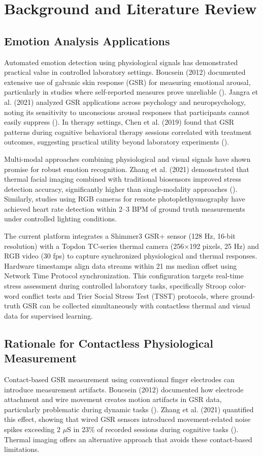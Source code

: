 \chapter{Background and Literature Review}


\section{Emotion Analysis Applications}
Automated emotion detection using physiological signals has demonstrated practical value in controlled laboratory settings. Boucsein (2012) documented extensive use of galvanic skin response (GSR) for measuring emotional arousal, particularly in studies where self-reported measures prove unreliable (\citep{ref1}). Jangra et al. (2021) analyzed GSR applications across psychology and neuropsychology, noting its sensitivity to unconscious arousal responses that participants cannot easily suppress (\citep{ref3}). In therapy settings, Chen et al. (2019) found that GSR patterns during cognitive behavioral therapy sessions correlated with treatment outcomes, suggesting practical utility beyond laboratory experiments (\citep{ref4}).

Multi-modal approaches combining physiological and visual signals have shown promise for robust emotion recognition. Zhang et al. (2021) demonstrated that thermal facial imaging combined with traditional biosensors improved stress detection accuracy, significantly higher than single-modality approaches (\citep{ref5}). Similarly, studies using RGB cameras for remote photoplethysmography have achieved heart rate detection within 2--3 BPM of ground truth measurements under controlled lighting conditions.

The current platform integrates a Shimmer3 GSR+ sensor (128 Hz, 16-bit resolution) with a Topdon TC-series thermal camera (256$\times$192 pixels, 25 Hz) and RGB video (30 fps) to capture synchronized physiological and thermal responses. Hardware timestamps align data streams within 21 ms median offset using Network Time Protocol synchronization. This configuration targets real-time stress assessment during controlled laboratory tasks, specifically Stroop color-word conflict tests and Trier Social Stress Test (TSST) protocols, where ground-truth GSR can be collected simultaneously with contactless thermal and visual data for supervised learning.


\section{Rationale for Contactless Physiological Measurement}
Contact-based GSR measurement using conventional finger electrodes can introduce measurement artifacts. Boucsein (2012) documented how electrode attachment and wire movement creates motion artifacts in GSR data, particularly problematic during dynamic tasks (\citep{ref1}). Zhang et al. (2021) quantified this effect, showing that wired GSR sensors introduced movement-related noise spikes exceeding 2 $\mu$S in 23\% of recorded sessions during cognitive tasks (\citep{ref5}). Thermal imaging offers an alternative approach that avoids these contact-based limitations.


